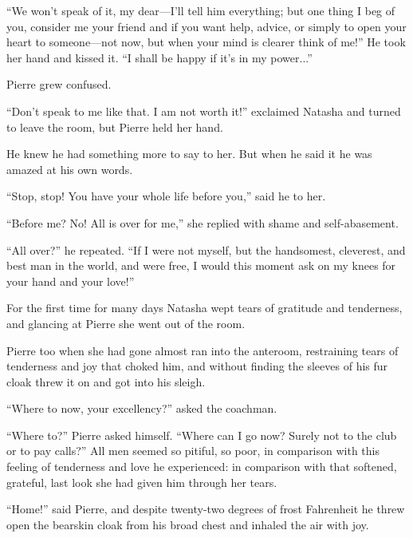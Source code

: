 ``We won't speak of it, my dear---I'll tell him everything; but
one thing I beg of you, consider me your friend and if you want
help, advice, or simply to open your heart to someone---not now,
but when your mind is clearer think of me!'' He took her hand and
kissed it. ``I shall be happy if it's in my power...''

Pierre grew confused.

``Don't speak to me like that. I am not worth it!'' exclaimed
Natasha and turned to leave the room, but Pierre held her hand.

He knew he had something more to say to her. But when he said it
he was amazed at his own words.

``Stop, stop! You have your whole life before you,'' said he to
her.

``Before me? No! All is over for me,'' she replied with shame and
self-abasement.

``All over?'' he repeated. ``If I were not myself, but the
handsomest, cleverest, and best man in the world, and were free,
I would this moment ask on my knees for your hand and your
love!''

For the first time for many days Natasha wept tears of gratitude
and tenderness, and glancing at Pierre she went out of the room.

Pierre too when she had gone almost ran into the anteroom,
restraining tears of tenderness and joy that choked him, and
without finding the sleeves of his fur cloak threw it on and got
into his sleigh.

``Where to now, your excellency?'' asked the coachman.

``Where to?'' Pierre asked himself. ``Where can I go now? Surely
not to the club or to pay calls?'' All men seemed so pitiful, so
poor, in comparison with this feeling of tenderness and love he
experienced: in comparison with that softened, grateful, last
look she had given him through her tears.

``Home!'' said Pierre, and despite twenty-two degrees of frost
Fahrenheit he threw open the bearskin cloak from his broad chest
and inhaled the air with joy.


